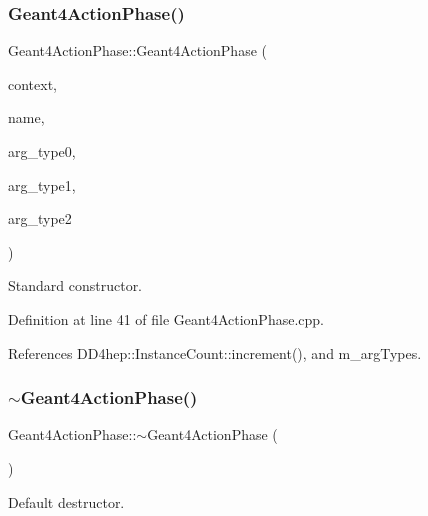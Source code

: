 \subsubsection{\texorpdfstring{Geant4\+Action\+Phase()}{Geant4ActionPhase()}}
{\footnotesize\ttfamily Geant4\+Action\+Phase\+::\+Geant4\+Action\+Phase (\begin{DoxyParamCaption}\item[{\hyperlink{class_d_d4hep_1_1_simulation_1_1_geant4_context}{Geant4\+Context} $\ast$}]{context,  }\item[{const std\+::string \&}]{name,  }\item[{const std\+::type\+\_\+info \&}]{arg\+\_\+type0,  }\item[{const std\+::type\+\_\+info \&}]{arg\+\_\+type1,  }\item[{const std\+::type\+\_\+info \&}]{arg\+\_\+type2 }\end{DoxyParamCaption})}



Standard constructor. 



Definition at line 41 of file Geant4\+Action\+Phase.\+cpp.



References D\+D4hep\+::\+Instance\+Count\+::increment(), and m\+\_\+arg\+Types.

\hypertarget{class_d_d4hep_1_1_simulation_1_1_geant4_action_phase_ae2d320d1dd7f433b5defb6f4fed5d757}{}\label{class_d_d4hep_1_1_simulation_1_1_geant4_action_phase_ae2d320d1dd7f433b5defb6f4fed5d757} 
\subsubsection{\texorpdfstring{$\sim$\+Geant4\+Action\+Phase()}{~Geant4ActionPhase()}}
{\footnotesize\ttfamily Geant4\+Action\+Phase\+::$\sim$\+Geant4\+Action\+Phase (\begin{DoxyParamCaption}{ }\end{DoxyParamCaption})\hspace{0.3cm}{\ttfamily [virtual]}}



Default destructor. 



